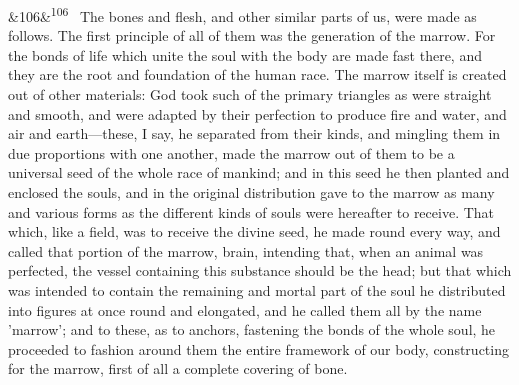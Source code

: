 \documentclass[12pt]{article}
\newcommand{\para}[1][]{\par\noindent\ifx&#1&\else\textsuperscript{\footnotesize #1}~\fi}
\begin{document}
\para[106] The bones and flesh, and other similar parts of us, were made as follows. The first principle of all of them was the generation of the marrow. For the bonds of life which unite the soul with the body are made fast there, and they are the root and foundation of the human race. The marrow itself is created out of other materials: God took such of the primary triangles as were straight and smooth, and were adapted by their perfection to produce fire and water, and air and earth---these, I say, he separated from their kinds, and mingling them in due proportions with one another, made the marrow out of them to be a universal seed of the whole race of mankind; and in this seed he then planted and enclosed the souls, and in the original distribution gave to the marrow as many and various forms as the different kinds of souls were hereafter to receive. That which, like a field, was to receive the divine seed, he made round every way, and called that portion of the marrow, brain, intending that, when an animal was perfected, the vessel containing this substance should be the head; but that which was intended to contain the remaining and mortal part of the soul he distributed into figures at once round and elongated, and he called them all by the name 'marrow'; and to these, as to anchors, fastening the bonds of the whole soul, he proceeded to fashion around them the entire framework of our body, constructing for the marrow, first of all a complete covering of bone.
\end{document}
